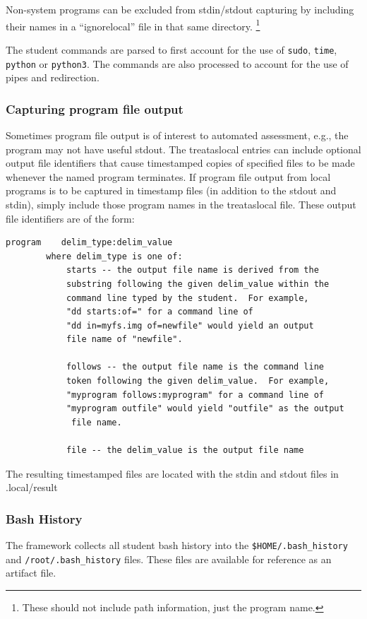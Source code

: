\documentclass[12pt]{article}
\begin{document}
Non-system programs can be excluded from stdin/stdout capturing by including their names in
a ``ignorelocal'' file in that same directory.  \footnote{These should not include path information, just the program name.}

The student commands are parsed to first account for the use of {\tt sudo}, {\tt time}, {\tt python} or {\tt python3}.
The commands are also processed to account for the use of pipes and redirection. 

\subsubsection{Capturing program file output}
\label{program output}
Sometimes program file output is of interest to automated assessment, e.g., the program
may not have useful stdout.
The treataslocal entries can include optional output file identifiers that
cause timestamped copies of specified files to be made whenever the named program terminates.
If program file output from local programs is to be captured in timestamp files (in addition
to the stdout and stdin), simply include those program names in the treataslocal file.
These output file identifiers are of the form:
\begin{verbatim}
program    delim_type:delim_value
        where delim_type is one of:
            starts -- the output file name is derived from the 
            substring following the given delim_value within the 
            command line typed by the student.  For example, 
            "dd starts:of=" for a command line of 
            "dd in=myfs.img of=newfile" would yield an output 
            file name of "newfile".
     
            follows -- the output file name is the command line 
            token following the given delim_value.  For example, 
            "myprogram follows:myprogram" for a command line of
            "myprogram outfile" would yield "outfile" as the output 
             file name.

            file -- the delim_value is the output file name
\end{verbatim}
\noindent The resulting timestamped files are located with the stdin and stdout files in .local/result

\subsubsection{Bash History}
The framework collects all student bash history into the \texttt{\$HOME/.bash\_history} and \newline
\texttt{/root/.bash\_history} files.  These files are
available for reference as an artifact file.  
\end{document}
